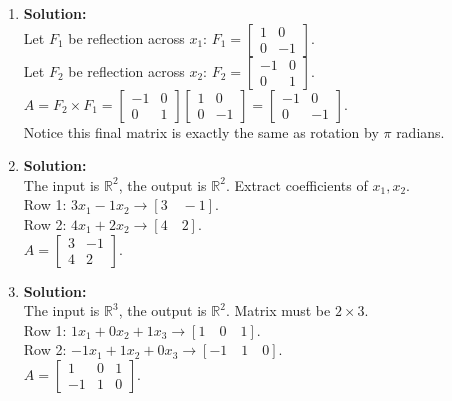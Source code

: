 \documentclass[12pt]{article}
\begin{document}
\begin{enumerate}
    \item \textbf{Solution:}\\
    Let $F_1$ be reflection across $x_1$: $F_1 = \begin{bmatrix} 1 & 0 \\ 0 & -1 \end{bmatrix}$. \\
    Let $F_2$ be reflection across $x_2$: $F_2 = \begin{bmatrix} -1 & 0 \\ 0 & 1 \end{bmatrix}$. \\
    $A = F_2 \times F_1 = \begin{bmatrix} -1 & 0 \\ 0 & 1 \end{bmatrix} \begin{bmatrix} 1 & 0 \\ 0 & -1 \end{bmatrix} = \begin{bmatrix} -1 & 0 \\ 0 & -1 \end{bmatrix}$. \\
    Notice this final matrix is exactly the same as rotation by $\pi$ radians.

    \item \textbf{Solution:}\\
    The input is $\mathbb{R}^2$, the output is $\mathbb{R}^2$. Extract coefficients of $x_1, x_2$. \\
    Row 1: $3x_1 - 1x_2 \rightarrow [3 \quad -1]$. \\
    Row 2: $4x_1 + 2x_2 \rightarrow [4 \quad 2]$. \\
    $A = \begin{bmatrix} 3 & -1 \\ 4 & 2 \end{bmatrix}$.

    \item \textbf{Solution:}\\
    The input is $\mathbb{R}^3$, the output is $\mathbb{R}^2$. Matrix must be $2 \times 3$. \\
    Row 1: $1x_1 + 0x_2 + 1x_3 \rightarrow [1 \quad 0 \quad 1]$. \\
    Row 2: $-1x_1 + 1x_2 + 0x_3 \rightarrow [-1 \quad 1 \quad 0]$. \\
    $A = \begin{bmatrix} 1 & 0 & 1 \\ -1 & 1 & 0 \end{bmatrix}$.


\end{enumerate}
\end{document}
